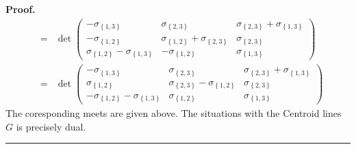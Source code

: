 \documentclass{unswthesis}
\newenvironment{proof}[1][Proof]{\noindent\textbf{#1.} }{\ \rule{0.5em}{0.5em}}
\begin{document}
\begin{proof}
\begin{eqnarray*}
&=&\det 
\begin{pmatrix}
-\sigma _{\left\{ 1,3\right\} } & \sigma _{\left\{ 2,3\right\} } & \sigma
_{\left\{ 2,3\right\} }+\sigma _{\left\{ 1,3\right\} } \\ 
-\sigma _{\left\{ 1,2\right\} } & \sigma _{\left\{ 1,2\right\} }+\sigma
_{\left\{ 2,3\right\} } & \sigma _{\left\{ 2,3\right\} } \\ 
\sigma _{\left\{ 1,2\right\} }-\sigma _{\left\{ 1,3\right\} } & -\sigma
_{\left\{ 1,2\right\} } & \sigma _{\left\{ 1,3\right\} }%
\end{pmatrix}
\\
&=&\det 
\begin{pmatrix}
-\sigma _{\left\{ 1,3\right\} } & \sigma _{\left\{ 2,3\right\} } & \sigma
_{\left\{ 2,3\right\} }+\sigma _{\left\{ 1,3\right\} } \\ 
\sigma _{\left\{ 1,2\right\} } & \sigma _{\left\{ 2,3\right\} }-\sigma
_{\left\{ 1,2\right\} } & \sigma _{\left\{ 2,3\right\} } \\ 
-\sigma _{\left\{ 1,2\right\} }-\sigma _{\left\{ 1,3\right\} } & \sigma
_{\left\{ 1,2\right\} } & \sigma _{\left\{ 1,3\right\} }%
\end{pmatrix}%
\end{eqnarray*}%
The coresponding meets are given above. The situations with the Centroid
lines $G$ is precisely dual.
\end{proof}
\end{document}

